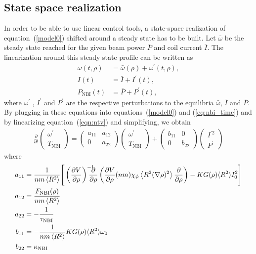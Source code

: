 \documentclass[12pt,lot, lof]{puthesis}
\begin{document}
\subsection{State space realization}
\label{SS}
In order to be able to use linear control tools, a state-space realization of equation~(\ref{model0})  shifted around a steady state has to be built.
Let $\bar{\omega}$ be the steady state reached for the given beam power $ \bar{P}$ and coil current $\bar{I}$. The linearization around this steady state profile can be written as
\begin{align}
\omega (t, \rho) &= \bar{\omega} (\rho) + \omega^{'}(t, \rho), \\
I (t) &= \bar{I} + I^{'}(t),\\
P_\text{NBI} (t) &= \bar{P} + P^{'}(t),
\end{align}
where $ \omega^{'}$ , $ I^{'}$ and $P^{'}$ are the respective perturbations to the equilibria $\bar{\omega}$, $\bar{I}$ and $\bar{P}$.
By plugging in these equations into equations~(\ref{model0}) and (\ref{eq:nbi_time}) and by linearizing equation~(\ref{eqn:ntv}) and simplifying, we obtain
\begin{multline}
\frac{\partial}{\partial t}   \left( \begin{array}{c}  \omega^{'} \\ \overline{T}_\text{NBI} \end{array}\right)
={ \left( \begin{array}{cc} a_{11}  & a_{12} \\ 0 & a_{22} \end{array} \right)} \left( \begin{array}{c} \omega^{'} \\ \overline{T}_\text{NBI}    \end{array}  \right) + \left(\begin{array}{cc} b_{11}  & 0 \\ 0 & b_{22}    \end{array}  \right) \left( \begin{array}{c}  I^{'2}  \\ P^{'}\end{array} \right)
	\label{SSR}
\end{multline}
 where
 \begin{align}
 a_{11} &=  \frac{1}{n m \left<R^2\right>} \Bigg[ \left( \frac{\partial V}{\partial\rho}\right)^{-1} 
   \hspace{-1em}\frac{\partial}{\partial \rho} 
   \left(\frac{\partial V}{\partial \rho}(n m)\chi_\phi
   \left< R^2 (\nabla \rho)^2\right> 
   \frac{\partial}{\partial\rho}\right)-K G(\rho) \langle R^2 \rangle  I^2_0 \Bigg]  \nonumber \\
 a_{12} &=  \frac{ F_\text{NBI}(\rho) }{n m \left<R^2\right>}\nonumber \\
 a_{22} &= - \frac{1}{\tau_\text{NBI}}  \nonumber \\  
 b_{11} &= - \frac{1}{n m \left<R^2\right>} K G(\rho) \langle R^2 \rangle  \omega_0 \nonumber \\
 b_{22} &= \kappa_\text{NBI} \nonumber
 \end{align}
\end{document}
